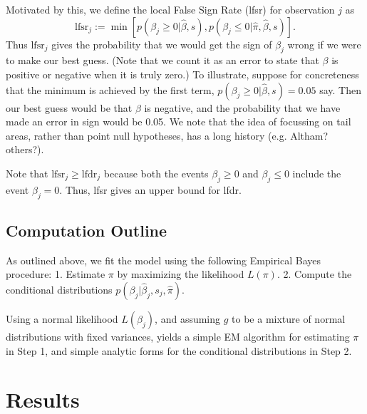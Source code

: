 \documentclass[11pt]{article}
\def\lfsr{\text{lfsr}}
\begin{document}
Motivated by this, we define the local False Sign Rate (lfsr) for observation $j$ as 
\begin{equation}
\lfsr_j := \min[ p(\beta_j \geq 0| \hat\beta, s), p(\beta_j \leq 0| \hat\pi, \hat\beta, s) ].
\end{equation}
Thus $\lfsr_j$ gives the probability that we would get the sign of $\beta_j$ wrong if we
were to make our best guess. (Note that we count it as an error to state that $\beta$ is positive or negative when it is truly zero.)
To illustrate, suppose for concreteness
that the minimum is achieved by the first term, $p(\beta_j \geq 0| \hat\beta, s)=0.05$ say. Then
our best guess would be that $\beta$ is negative, and the probability that we have
made an error in sign would be 0.05. We note that the idea of focussing on tail areas, rather than point null hypotheses,
has a long history (e.g. Altham? others?).

Note that $\text{lfsr}_j \geq \text{lfdr}_j$ 
because both the events $\beta_j \geq 0$
and $\beta_j \leq 0$ include the event $\beta_j=0$.
Thus, lfsr gives an upper bound for lfdr.






\subsection{Computation Outline}

As outlined above, we fit the model using the following Empirical Bayes procedure:
1. Estimate $\pi$ by maximizing the likelihood $L(\pi)$.
2. Compute the conditional distributions $p(\beta_j | \hat\beta_j, s_j, \hat\pi)$.

Using a normal likelihood $L(\beta_j)$, and assuming
$g$ to be a mixture of normal distributions with fixed variances, 
yields a simple EM algorithm
for estimating $\pi$ in Step 1, and simple analytic forms for the conditional
distributions in Step 2.


\section*{Results}
\end{document}

